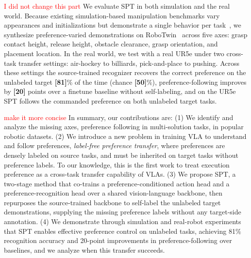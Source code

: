 \documentclass{article}
\begin{document}
\textcolor{red}{I did not change this part}
We evaluate SPT in both simulation and the real world. Because existing simulation-based manipulation benchmarks vary appearances and initializations but demonstrate a single behavior per task~\citep{libero, liberoplus}, we synthesize preference-varied demonstrations on RoboTwin~\citep{robotwin} across five axes: grasp contact height, release height, obstacle clearance, grasp orientation, and placement location. In the real world, we test with a real UR5e under two cross-task transfer settings: air-hockey to billiards, pick-and-place to pushing.
Across these settings the source-trained recognizer recovers the correct preference on the unlabeled target \textbf{[81]}\% of the time (chance \textbf{[50]}\%), preference-following improves by \textbf{[20]} points over a finetune baseline without self-labeling, and on the UR5e SPT follows the commanded preference on both unlabeled target tasks.

\textcolor{red}{make it more concise}
In summary, our contributions are: 
(1) We identify and analyze the missing axes, preference following in multi-solution tasks, in popular robotic datasets.
(2) We introduce a new problem in training VLA to understand and follow preferences, \emph{label-free preference transfer}, where preferences are densely labeled on source tasks, and must be inherited on target tasks without preference labels. To our knowledge, this is the first work to treat execution preference as a cross-task transfer capability of VLAs. (3) We propose SPT, a two-stage method that co-trains a preference-conditioned action head and a preference-recognition head over a shared vision-language backbone, then repurposes the source-trained backbone to self-label the unlabeled target demonstrations, supplying the missing preference labels without any target-side annotation.
(4) We demonstrate through simulation and real-robot experiments that SPT enables effective preference control on unlabeled tasks, achieving 81\% recognition accuracy and 20-point improvements in preference-following over baselines, and we analyze when this transfer succeeds.

 
\end{document}
